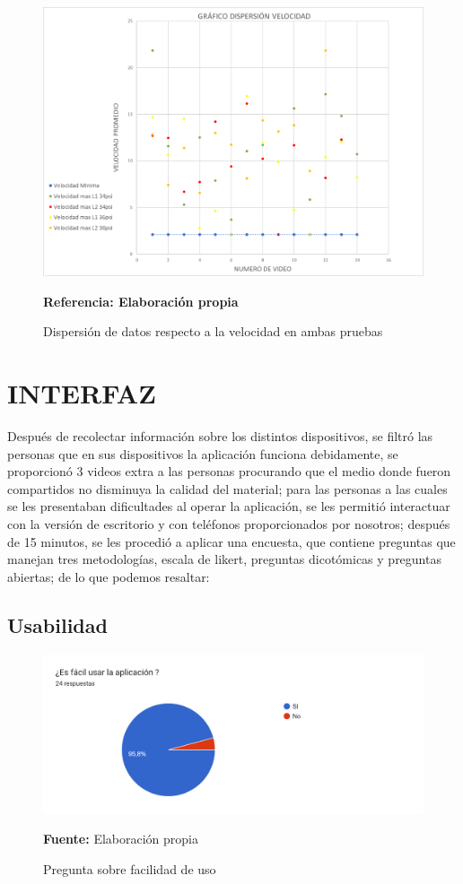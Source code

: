 \documentclass[12pt,twocolumn,a4paper]{article}
\begin{document}
\begin{figure}[h!]

	\centering
	\includegraphics[scale=0.4]{Dispvel.png}
	\caption{Dispersión de datos respecto a la velocidad en ambas pruebas } \textbf{Referencia: Elaboración propia} 
	\label{dispvel}
\end{figure}

\section{INTERFAZ}

Después de recolectar información sobre los distintos dispositivos, se filtró las personas que en sus dispositivos la aplicación funciona debidamente, se proporcionó 3 videos extra a  las personas procurando que el medio donde fueron compartidos no disminuya la calidad del material; para las personas a las cuales se les presentaban dificultades al operar la aplicación, se les permitió interactuar con la versión de escritorio y con teléfonos proporcionados por nosotros; después de  15 minutos, se les procedió a aplicar una encuesta, que contiene preguntas  que manejan tres metodologías, escala de likert, preguntas dicotómicas y preguntas abiertas; de lo que podemos resaltar:

\subsection{Usabilidad}

\begin{figure}
	\includegraphics[scale=0.4]{Encuesta1.png}
	\caption{Pregunta sobre facilidad de uso} \textbf{Fuente:} Elaboración propia 
	\label{Encuesta1}
\end{figure}
\end{document}
